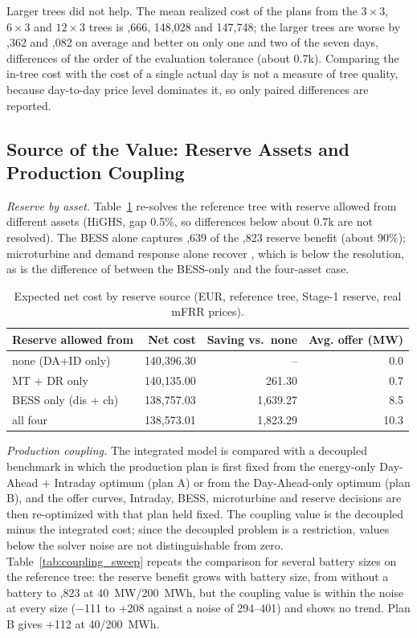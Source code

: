 \documentclass[journal]{IEEEtran}
\begin{document}
Larger trees did not help. The mean realized cost of the plans from the $3\times3$, $6\times3$ and $12\times3$ trees is ,666, 148,028 and 147,748; the larger trees are worse by ,362 and ,082 on average and better on only one and two of the seven days, differences of the order of the evaluation tolerance (about \texteuro 0.7k). Comparing the in-tree cost with the cost of a single actual day is not a measure of tree quality, because day-to-day price level dominates it, so only paired differences are reported.

\subsection{Source of the Value: Reserve Assets and Production Coupling}
\label{sec:attribution}
\textit{Reserve by asset.} Table~\ref{tab:reserve_assets} re-solves the reference tree with reserve allowed from different assets (HiGHS, gap 0.5\%, so differences below about \texteuro 0.7k are not resolved). The BESS alone captures ,639 of the ,823 reserve benefit (about 90\%); microturbine and demand response alone recover , which is below the resolution, as is the difference of  between the BESS-only and the four-asset case.

\begin{table}[t]
\caption{Expected net cost by reserve source (EUR, reference tree, Stage-1 reserve, real mFRR prices).}
\label{tab:reserve_assets}
\centering
\small
\begin{tabular}{@{}lrrr@{}}
\toprule
\textbf{Reserve allowed from} & \textbf{Net cost} & \textbf{Saving vs.\ none} & \textbf{Avg. offer (MW)} \\
\midrule
none (DA+ID only) & 140,396.30 & -- & 0.0 \\
MT + DR only & 140,135.00 & 261.30 & 0.7 \\
BESS only (dis + ch) & 138,757.03 & 1,639.27 & 8.5 \\
all four & 138,573.01 & 1,823.29 & 10.3 \\
\bottomrule
\end{tabular}
\end{table}

\textit{Production coupling.} The integrated model is compared with a decoupled benchmark in which the production plan is first fixed from the energy-only Day-Ahead + Intraday optimum (plan A) or from the Day-Ahead-only optimum (plan B), and the offer curves, Intraday, BESS, microturbine and reserve decisions are then re-optimized with that plan held fixed. The coupling value is the decoupled minus the integrated cost; since the decoupled problem is a restriction, values below the solver noise are not distinguishable from zero. Table~\ref{tab:coupling_sweep} repeats the comparison for several battery sizes on the reference tree: the reserve benefit grows with battery size, from  without a battery to ,823 at 40~MW/200~MWh, but the coupling value is within the noise at every size ($-$111 to +208 against a noise of 294--401) and shows no trend. Plan B gives +112 at 40/200~MWh.
\end{document}
